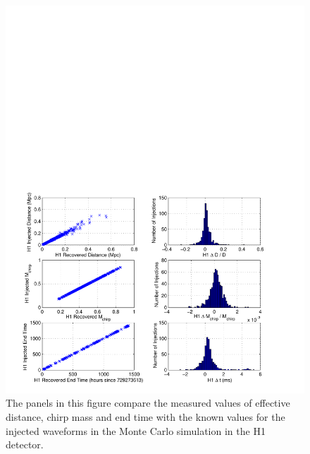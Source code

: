 \begin{figure}[p]
\begin{center}
\includegraphics[width=\textwidth]{figures/result/h1_param_error}
\end{center}
\caption[Measurement accuracy of H1 Injection Parameters]{%
\label{f:h1_param_error}%
The panels in this figure compare the measured values of effective distance,
chirp mass and end time with the known values for the injected waveforms in
the Monte Carlo simulation in the H1 detector.
}
\end{figure}


